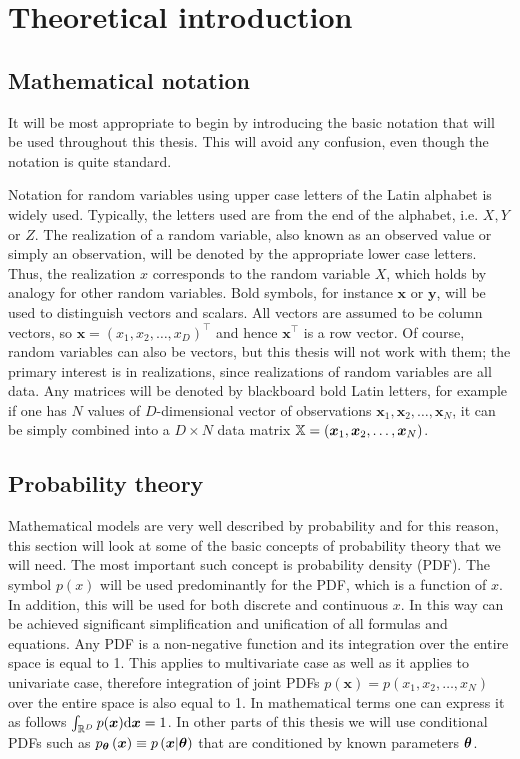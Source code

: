 \chapter{Theoretical introduction}

\section{Mathematical notation}\label{sec:terminology}
It will be most appropriate to begin by introducing the basic notation that will be used throughout this thesis. This will avoid any confusion, even though the notation is quite standard. 

Notation for random variables using upper case letters of the Latin alphabet is widely used. Typically, the letters used are from the end of the alphabet, i.e. $X,Y$ or $Z$. The realization of a random variable, also known as an observed value or simply an observation, will be denoted by the appropriate lower case letters. Thus, the realization  $x$ corresponds to the random variable $X$, which holds by analogy for other random variables. Bold symbols, for instance $\boldsymbol{x}$ or $\boldsymbol{y}$, will be used to distinguish vectors and scalars. All vectors are assumed to be column vectors, so $\boldsymbol{x} = \left(x_1,x_2,\dots,x_D\right)^\top$ and hence $\boldsymbol{x}^\top$ is a row vector. Of course, random variables can also be vectors, but this thesis will not work with them; the primary interest is in realizations, since realizations of random variables are all data. Any matrices will be denoted by blackboard bold Latin letters, for example if one has $N$ values of $D$-dimensional vector of observations $\boldsymbol{x}_1,\boldsymbol{x}_2,\dots,\boldsymbol{x}_N$, it can be simply combined into a $D \times N$ data matrix $\mathbb{X}=\left(\boldsymbol{x}_{1},\boldsymbol{x}_{2},\dots,\boldsymbol{x}_{N}\right)$. 



\section{Probability theory}
Mathematical models are very well described by probability and for this reason, this section will look at some of the basic concepts of probability theory that we will need. The most important such concept is probability density (PDF). The symbol $p(x)$ will be used predominantly for the PDF, which is a function of $x$.  In addition, this will be used for both discrete and continuous $x$. In this way can be achieved significant simplification and unification of all formulas and equations. Any PDF is a non-negative function and its integration over the entire space is equal to 1. This applies to multivariate case as well as it applies to univariate case, therefore integration of joint PDFs $p(\boldsymbol{x}) = p\left(x_1, x_2, \dots, x_N\right)$ over the entire space is also equal to 1. In mathematical terms one can express it as follows $\int_{\mathbb{R}^D}p(\boldsymbol{x})\mathrm{d}{\boldsymbol{x}} = 1$. In other parts of this thesis we will use conditional PDFs such as $p_{\boldsymbol{\theta}}\left(\boldsymbol{x}\right) \equiv p\left(\boldsymbol{x}|\boldsymbol{\theta}\right)  $ that are conditioned by known parameters $\boldsymbol{\theta}$. 

